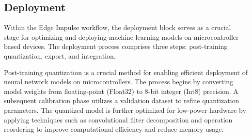 \subsection{Deployment}

Within the Edge Impulse workflow, the deployment block serves as a crucial stage for optimizing and deploying machine learning models on microcontroller-based devices. The deployment process comprises three steps: post-training quantization, export, and integration.

Post-training quantization is a crucial method for enabling efficient deployment of neural network models on microcontrollers. The process begins by converting model weights from floating-point (Float32) to 8-bit integer (Int8) precision. A subsequent calibration phase utilizes a validation dataset to refine quantization parameters. The quantized model is further optimized for low-power hardware by applying techniques such as convolutional filter decomposition and operation reordering to improve computational efficiency and reduce memory usage.
